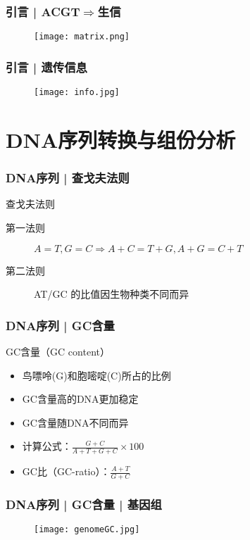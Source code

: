 \begin{frame}
	\frametitle{引言 | ACGT$\Rightarrow$生信}
	\begin{figure}
		\centering
		\texttt{[image: matrix.png]}
	\end{figure}
\end{frame}

\begin{frame}
	\frametitle{引言 | 遗传信息}
	\begin{figure}
		\centering
		\texttt{[image: info.jpg]}
	\end{figure}
\end{frame}

\section{DNA序列转换与组份分析}
\begin{frame}
	\frametitle{DNA序列 | 查戈夫法则}
	\begin{block}{查戈夫法则}
		\begin{description}
			\item[第一法则]$A=T, G=C \Longrightarrow A+C=T+G, A+G=C+T$
			\item[第二法则]AT/GC 的比值因生物种类不同而异
		\end{description}
	\end{block}
\end{frame}

\begin{frame}
	\frametitle{DNA序列 | GC含量}
	\begin{block}{GC含量（GC content）}
		\begin{itemize}
			\item 鸟嘌呤(G)和胞嘧啶(C)所占的比例
			\item GC含量高的DNA更加稳定
			\item GC含量随DNA不同而异
			\item 计算公式：$\frac{G+C}{A+T+G+C}\times100$
			\item GC比（GC-ratio）：$\frac{A+T}{G+C}$
		\end{itemize}
	\end{block}
\end{frame}

\begin{frame}
	\frametitle{DNA序列 | GC含量 | 基因组}
	\begin{figure}
		\centering
		\texttt{[image: genomeGC.jpg]}
	\end{figure}
\end{frame}

